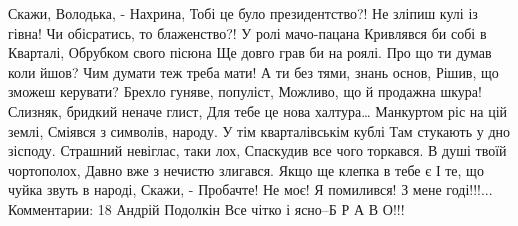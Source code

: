  
 
 
 
 

Скажи, Володька, - Нахрина,
Тобі це було президентство?!
Не зліпиш кулі із гівна!
Чи обісратись, то блаженство?!
У ролі мачо-пацана
Кривлявся би собі в Кварталі,
Обрубком свого пісюна
Ще довго грав би на роялі.
Про що ти думав коли йшов?
Чим думати теж треба мати!
А ти без тями, знань основ,
Рішив, що зможеш керувати?
Брехло гуняве, популіст,
Можливо, що й продажна шкура!
Слизняк, бридкий неначе глист,
Для тебе це нова халтура…
Манкуртом ріс на цій землі,
Сміявся з символів, народу.
У тім кварталівськім кублі
Там стукають у дно зісподу.
Страшний невіглас, таки лох,
Спаскудив все чого торкався.
В душі твоїй чортополох,
Давно вже з нечистю злигався.
Якщо ще клепка в тебе є
І те, що чуйка звуть в народі,
Скажи, - Пробачте! Не моє!
Я помилився! З мене годі!!!...
Комментарии: 18
Андрій Подолкін
Все чітко і ясно–Б Р А В О!!!



